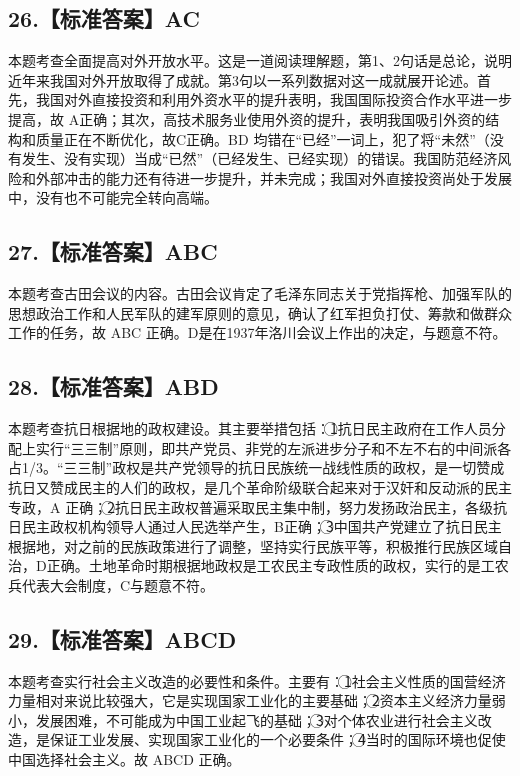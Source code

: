 \documentclass[UTF8,11pt]{ctexart}
\begin{document}
\subsection*{26.【标准答案】AC}

本题考查全面提高对外开放水平。这是一道阅读理解题，第1、2句话是总论，说明近年来我国对外开放取得了成就。第3句以一系列数据对这一成就展开论述。首先，我国对外直接投资和利用外资水平的提升表明，我国国际投资合作水平进一步提高，故 A正确；其次，高技术服务业使用外资的提升，表明我国吸引外资的结构和质量正在不断优化，故C正确。BD 均错在“已经”一词上，犯了将“未然”（没有发生、没有实现）当成“已然”（已经发生、已经实现）的错误。我国防范经济风险和外部冲击的能力还有待进一步提升，并未完成；我国对外直接投资尚处于发展中，没有也不可能完全转向高端。


\subsection*{27.【标准答案】ABC}

本题考查古田会议的内容。古田会议肯定了毛泽东同志关于党指挥枪、加强军队的思想政治工作和人民军队的建军原则的意见，确认了红军担负打仗、筹款和做群众工作的任务，故 ABC 正确。D是在1937年洛川会议上作出的决定，与题意不符。


\subsection*{28.【标准答案】ABD}

本题考查抗日根据地的政权建设。其主要举措包括：\textcircled{1}抗日民主政府在工作人员分配上实行“三三制”原则，即共产党员、非党的左派进步分子和不左不右的中间派各占1/3。“三三制”政权是共产党领导的抗日民族统一战线性质的政权，是一切赞成抗日又赞成民主的人们的政权，是几个革命阶级联合起来对于汉奸和反动派的民主专政，A 正确；\textcircled{2}抗日民主政权普遍采取民主集中制，努力发扬政治民主，各级抗日民主政权机构领导人通过人民选举产生，B正确；\textcircled{3}中国共产党建立了抗日民主根据地，对之前的民族政策进行了调整，坚持实行民族平等，积极推行民族区域自治，D正确。土地革命时期根据地政权是工农民主专政性质的政权，实行的是工农兵代表大会制度，C与题意不符。


\subsection*{29.【标准答案】ABCD}

本题考查实行社会主义改造的必要性和条件。主要有：\textcircled{1}社会主义性质的国营经济力量相对来说比较强大，它是实现国家工业化的主要基础；\textcircled{2}资本主义经济力量弱小，发展困难，不可能成为中国工业起飞的基础；\textcircled{3}对个体农业进行社会主义改造，是保证工业发展、实现国家工业化的一个必要条件；\textcircled{4}当时的国际环境也促使中国选择社会主义。故 ABCD 正确。
\end{document}
